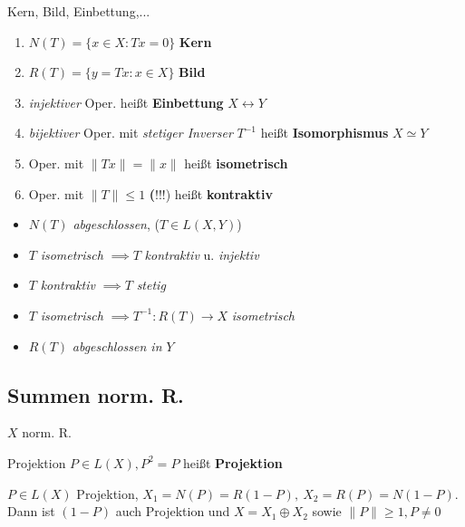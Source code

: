 \begin{definition}{Kern, Bild, Einbettung,...}
  \begin{enumerate}[label = (\roman*)]
    \item $N(T) = \{x \in X: Tx =0\}$ \textbf{Kern}
    \item $R(T) = \{y = Tx: x \in X\}$ \textbf{Bild}
    \item \textit{injektiver} Oper. heißt \textbf{Einbettung}
      $X \leftrightarrow Y$
    \item \textit{bijektiver} Oper. mit \textit{stetiger Inverser} $T^{-1}$
     heißt \textbf{Isomorphismus} $X \simeq Y$
    \item Oper. mit $\|Tx\| = \|x\|$ heißt \textbf{isometrisch}
    \item Oper. mit $\|T\| \leq 1$ \textbf(!!!) heißt \textbf{kontraktiv}
  \end{enumerate}
\end{definition}

\begin{bemerkung}
  \begin{itemize}
    \item $N(T)$ \textit{abgeschlossen}, ($T\in L(X,Y)$)
    \item $T$ \textit{isometrisch} $\implies T$ \textit{kontraktiv} u.
      \textit{injektiv}
    \item $T$ \textit{kontraktiv} $\implies T$ \textit{stetig}
    \item $T$ \textit{isometrisch} $\implies T^{-1}:R(T) \to X$
      \textit{isometrisch}
    \item $R(T)$ \textit{abgeschlossen in} $Y$
  \end{itemize}
\end{bemerkung}


\subsection{Summen norm. R.}
  $X$ norm. R.

\begin{definition}{Projektion}
  $P \in L(X), P^2=P$ heißt \textbf{Projektion}
\end{definition}

\begin{lemma}
  $P \in L(X)$ Projektion, $X_1 = N(P) = R(1-P),\ X_2 = R(P) = N(1-P)$.
  Dann ist $(1-P)$ auch Projektion und $X = X_1 \oplus X_2$ sowie
  $\|P\| \geq 1, P \neq 0$
\end{lemma}

